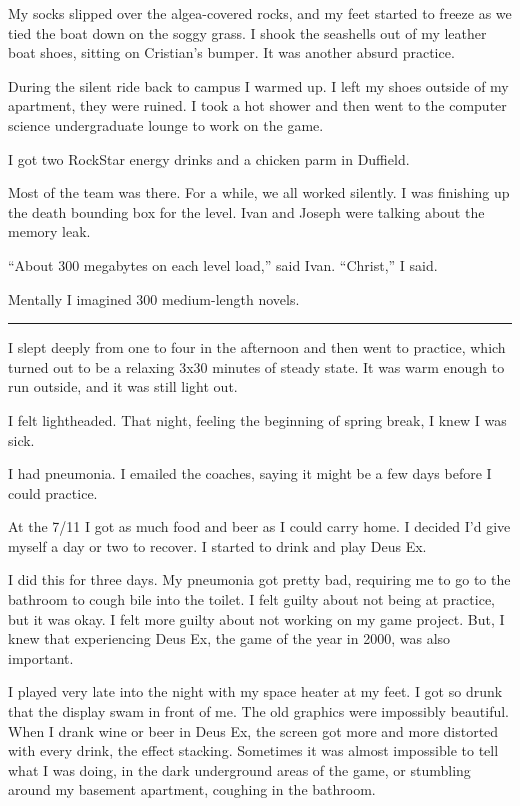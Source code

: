 My socks slipped over the algea-covered rocks, and my feet started to freeze as
we tied the boat down on the soggy grass.  I shook the seashells out of my
leather boat shoes, sitting on Cristian's bumper.  It was another absurd
practice.  

During the silent ride back to campus I warmed up.  I left my shoes outside of
my apartment, they were ruined.  I took a hot shower and then went to the
computer science undergraduate lounge to work on the game.

I got two RockStar energy drinks and a chicken parm in Duffield.

Most of the team was there.  For a while, we all worked silently.  I was
finishing up the death bounding box for the level.  Ivan and Joseph were
talking about the memory leak.

``About 300 megabytes on each level load,'' said Ivan.  ``Christ,'' I said.

Mentally I imagined 300 medium-length novels.

\plainfancybreak{12pt}{2}{* * *}

I slept deeply from one to four in the afternoon and then went to practice,
which turned out to be a relaxing 3x30 minutes of steady state.  It was warm
enough to run outside, and it was still light out.

I felt lightheaded.  That night, feeling the beginning of spring break, I knew I
was sick.  

I had pneumonia.  I emailed the coaches, saying it might be a few days before I
could practice.  

At the 7/11 I got as much food and beer as I could carry home.  I decided I'd
give myself a day or two to recover.  I started to drink and play Deus Ex.  

I did this for three days.  My pneumonia got pretty bad, requiring me to go to
the bathroom to cough bile into the toilet.  I felt guilty about not being at
practice, but it was okay.  I felt more guilty about not working on my game
project.  But, I knew that experiencing Deus Ex, the game of the year in 2000,
was also important.

I played very late into the night with my space heater at my feet.  I got so
drunk that the display swam in front of me.  The old graphics were impossibly
beautiful.  When I drank wine or beer in Deus Ex, the screen got more and more
distorted with every drink, the effect stacking.  Sometimes it was almost
impossible to tell what I was doing, in the dark underground areas of the game,
or stumbling around my basement apartment, coughing in the bathroom.

